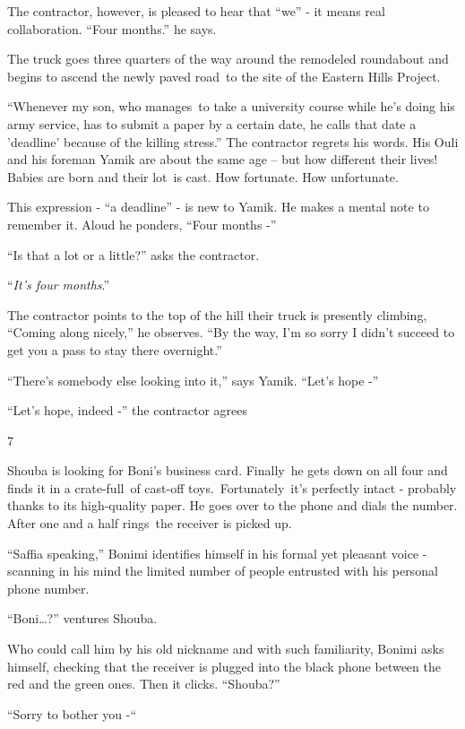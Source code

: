 \documentclass[twoside,11pt]{book}
\begin{document}
The contractor, however, is pleased to hear that ``we'' - it means real collaboration. ``Four
months.'' he says.\ 

The truck goes three quarters of the way around the remodeled roundabout and begins to ascend the newly paved road~to
the site of the Eastern Hills Project. 

``Whenever my son, who manages{\ }to take a university course while he's doing his army
service, has to submit a paper by a certain date, he calls that date a 'deadline' because of the killing
stress.'' The contractor regrets his words. His Ouli and his foreman Yamik are about the same age -- but
how different their lives! Babies are born and their lot~is cast. How fortunate. How unfortunate.

This expression - ``a deadline'' - is new to Yamik. He makes a mental note to remember it.
Aloud he ponders, ``Four months -''

``Is that a lot or a little?'' asks the contractor. 

``\textit{It's four months}.'' 

The contractor points to the top of the hill their truck is presently climbing, ``Coming along nicely,'' he
observes. ``By the way, I'm so sorry I didn't succeed to get you a pass to stay there overnight.'' 

``There's somebody else looking into it,'' says Yamik. ``Let's hope
-'' 

``Let's hope, indeed -'' the contractor agrees


\bigskip

7\ \ 

Shouba is looking for Boni's business card. Finally\ he gets down on all four and finds it in a crate-full~of cast-off
toys.\ Fortunately\ it's perfectly intact -  probably thanks to its high-quality paper. He goes over to the phone and
dials the number. After one and a half rings~the receiver is picked up.

``Saffia speaking,'' Bonimi identifies himself in his formal yet pleasant voice - scanning in
his mind the limited number of people entrusted with his personal phone number.

``Boni{\dots}?'' ventures Shouba. 

Who could call him by his old nickname and with such familiarity, Bonimi asks himself, checking that the receiver is
plugged into the black phone between the red and the green ones. Then it clicks. ``Shouba?'' 

``Sorry to bother you -``\ 
\end{document}

